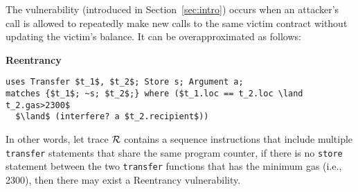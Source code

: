 The \reentrancy vulnerability (introduced in Section~\ref{sec:intro}) 
 occurs when an attacker's call is allowed to 
repeatedly make new calls to the same victim contract without updating the victim's balance. 
It can be overapproximated as follows:
\begin{vul}{{\bf Reentrancy}} 
\begin{lstlisting}[numbers=none,morekeywords={uses,matches,where,interfere,within}]
uses Transfer $t_1$, $t_2$; Store s; Argument a;
matches {$t_1$; ~s; $t_2$;} where ($t_1.loc == t_2.loc \land t_2.gas>2300$
  $\land$ (interfere? a $t_2.recipient$))
\end{lstlisting}


\end{vul}
\noindent In other words, let trace $\mathcal{R}$ contains a sequence instructions that include multiple \texttt{transfer} statements that share the same program counter, if there is no \texttt{store} statement between the two \texttt{transfer} functions that has the minimum gas (i.e., 2300), then there may exist a Reentrancy vulnerability.
